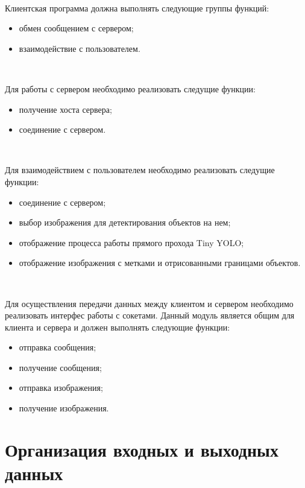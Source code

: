 \documentclass[a4paper,english]{G2-105}
\begin{document}
~\ 
\par Клиентская программа должна выполнять следующие группы функций:
\begin{itemize}
\item обмен сообщением с сервером;
\item взаимодействие с пользователем.
\end{itemize}
~\ 
\par Для работы с сервером необходимо реализовать следущие функции:
\begin{itemize}
\item получение хоста сервера;
\item соединение с сервером.
\end{itemize}
~\ 
\par Для взаимодействием с пользователем необходимо реализовать следущие функции:
\begin{itemize}
\item соединение с сервером;
\item выбор изображения для детектирования объектов на нем;
\item отображение процесса работы прямого прохода Tiny YOLO;
\item отображение изображения с метками и отрисованными границами объектов.
\end{itemize}
~\ 
\par Для осуществления передачи данных между клиентом и сервером необходимо реализовать интерфес работы с сокетами. Данный модуль является общим для клиента и сервера и должен выполнять следующие функции:
\begin{itemize}
\item отправка сообщения;
\item получение сообщения;
\item отправка изображения;
\item получение изображения.
\end{itemize} 
\ttl
\section{Организация входных и выходных данных}\ttl \ttl
\end{document}
